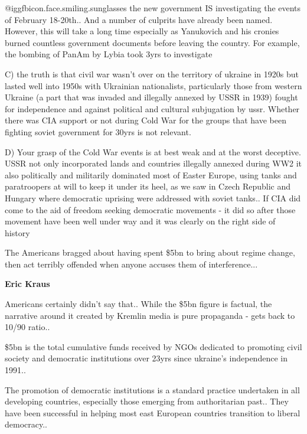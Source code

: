 \begin{itemize}
@igg{fbicon.face.smiling.sunglasses}  the new government IS investigating the
events of February 18-20th.. And a number of culprits have already been named.
However, this will take a long time especially as Yanukovich and his cronies
burned countless government documents before leaving the country. For example,
the bombing of PanAm by Lybia took 3yrs to investigate

C) the truth is that civil war wasn't over on the territory of ukraine in 1920s
but lasted well into 1950s with Ukrainian nationalists, particularly those from
western Ukraine (a part that was invaded and illegally annexed by USSR in 1939)
fought for independence and against political and cultural subjugation by ussr.
Whether there was CIA support or not during Cold War for the groups that have
been fighting soviet government for 30yrs is not relevant.

D) Your grasp of the Cold War events is at best weak and at the worst
deceptive. USSR not only incorporated lands and countries illegally annexed
during WW2 it also politically and militarily dominated most of Easter Europe,
using tanks and paratroopers at will to keep it under its heel, as we saw in
Czech Republic and Hungary where democratic uprising were addressed with soviet
tanks.. If CIA did come to the aid of freedom seeking democratic movements - it
did so after those movement have been well under way and it was clearly on the
right side of history

\begin{itemize} %

The Americans bragged about having spent \$5bn to bring about regime change,
then act terribly offended when anyone accuses them of interference...


\textbf{Eric Kraus} 

Americans certainly didn't say that.. While the \$5bn figure is factual, the narrative around it created by Kremlin media is pure propaganda - gets back to 10/90 ratio..

\$5bn is the total cumulative funds received by NGOs dedicated to promoting
civil society and democratic institutions over 23yrs since ukraine's
independence in 1991..

The promotion of democratic institutions is a standard practice undertaken in
all developing countries, especially those emerging from authoritarian past..
They have been successful in helping most east European countries transition to
liberal democracy..


\end{itemize}
\end{itemize}
